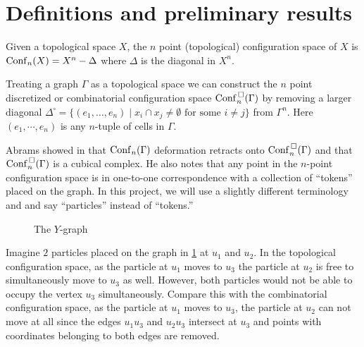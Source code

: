 \section{Definitions and preliminary results}
Given a topological space \(X\), the \(n\) point (topological) configuration space of \(X\) is
\(\mathrm{Conf}_n(X) = X^n - \Delta\) where \(\Delta\) is the diagonal in \(X^n\).

Treating a graph \(\Gamma\) as a topological space we can construct the
\(n\) point discretized or combinatorial configuration space \(\mathrm{Conf}^{\,\square}_n(\Gamma)\) by 
removing a larger diagonal \(\Delta^{\square} = \{(e_1, \ldots, e_n) \mid x_i \cap x_j \neq \emptyset \text{ for some } i \neq j\}\)
from \(\Gamma^n\). Here \((e_1, \cdots, e_n)\) is any \(n\)-tuple of cells in \(\Gamma\).

Abrams showed in \cite{abrams2000configurationspaces} that \(\mathrm{Conf}_n(\Gamma)\) deformation retracts onto \(\mathrm{Conf}^{\,\square}_n(\Gamma)\) and
that \(\mathrm{Conf}^{\,\square}_n(\Gamma)\) is a cubical complex.
He also notes that any point in the
\(n\)-point configuration space is in one-to-one correspondence with a
collection of ``tokens'' placed on the graph. In this project, we will use a slightly different terminology and
and say ``particles'' instead of ``tokens.''


\begin{figure}[h!]
\centering
{}
\caption{The \(Y\)-graph}
\label{fig:ygraph}
\end{figure}
Imagine \(2\) particles placed on the graph in \ref{fig:ygraph} at \(u_1\) and \(u_2\).  
In the topological configuration space, as the particle at \(u_1\) moves to \(u_3\)
the particle at \(u_2\) is free to simultaneously move to \(u_3\) as well. 
However, both particles would not be able to occupy the vertex \(u_3\) simultaneously.  
Compare this with the combinatorial configuration space, as the
particle at \(u_1\) moves to \(u_3\), the particle at \(u_2\) can not move at
all since the edges \(u_1 u_3\) and \(u_2 u_3\) intersect at \(u_3\) and points
with coordinates belonging to both edges are removed.

